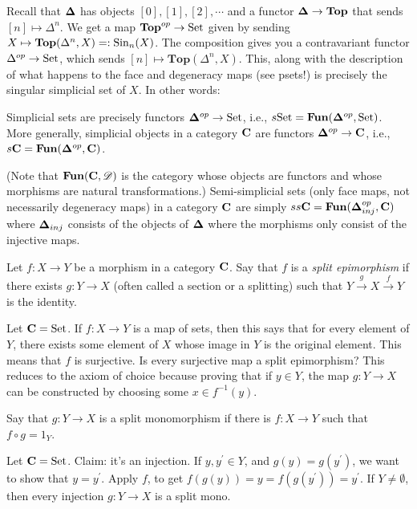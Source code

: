 Recall that ${\mathbf \Delta}$ has objects $[0],[1],[2],\cdots$ and a functor ${\mathbf \Delta}\to\mathbf{Top}$ that sends $[n]\mapsto\Delta^n$. We get a map $\mathbf{Top}^{op}\to{\mathrm{Set}}$ given by sending $X\mapsto\mathbf{Top}(\Delta^n,X)=:\mathrm{Sin}_n(X)$. The composition gives you a contravariant functor $\Delta^{op}\to{\mathrm{Set}}$, which sends $[n]\mapsto\mathbf{Top}(\Delta^n,X)$. This, along with the description of what happens to the face and degeneracy maps (see psets!) is precisely the singular simplicial set of $X$. In other words:
\begin{prop}
Simplicial sets are precisely functors ${\mathbf \Delta}^{op}\to{\mathrm{Set}}$, i.e., $s{\mathrm{Set}}=\mathbf{Fun}({\mathbf \Delta}^{op},{\mathrm{Set}})$. More generally, simplicial objects in a category $\mathbf C$ are functors ${\mathbf \Delta}^{op}\to\mathbf C$, i.e., $s\mathbf C=\mathbf{Fun}({\mathbf \Delta}^{op},\mathbf C)$.
\end{prop}
(Note that $\mathbf{Fun}(\mathbf C,\mathscr D)$ is the category whose objects are functors and whose morphisms are natural transformations.) Semi-simplicial sets (only face maps, not necessarily degeneracy maps) in a category $\mathbf C$ are simply $ss\mathbf C=\mathbf{Fun}({\mathbf \Delta}^{op}_{inj},\mathbf C)$ where ${\mathbf \Delta}_{inj}$ consists of the objects of ${\mathbf \Delta}$ where the morphisms only consist of the injective maps.
\begin{definition}
Let $f:X\to Y$ be a morphism in a category $\mathbf C$. Say that $f$ is a \textit{split epimorphism} if there exists $g:Y\to X$ (often called a section or a splitting) such that $Y\xrightarrow{g}X\xrightarrow{f}Y$ is the identity.
\end{definition}
\begin{example}
Let $\mathbf C={\mathrm{Set}}$. If $f:X\to Y$ is a map of sets, then this says that for every element of $Y$, there exists some element of $X$ whose image in $Y$ is the original element. This means that $f$ is surjective. Is every surjective map a split epimorphism? This reduces to the axiom of choice because proving that if $y\in Y$, the map $g:Y\to X$ can be constructed by choosing some $x\in f^{-1}(y)$.
\end{example}
\begin{definition}
Say that $g:Y\to X$ is a split monomorphism if there is $f:X\to Y$ such that $f\circ g=1_Y$.
\end{definition}
\begin{example}
Let $\mathbf C={\mathrm{Set}}$. Claim: it's an injection. If $y,y^\prime\in Y$, and $g(y)=g(y^\prime)$, we want to show that $y=y^\prime$. Apply $f$, to get $f(g(y))=y=f(g(y^\prime))=y^\prime$. If $Y\neq \emptyset$, then every injection $g:Y\to X$ is a split mono.
\end{example}
